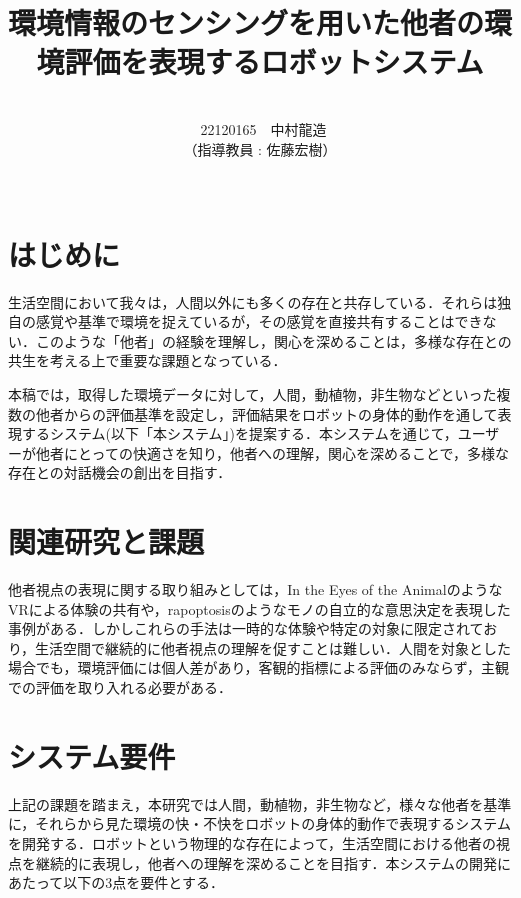 \documentclass[paper=a4paper,jafontsize=9pt,head_space=15mm,gutter=20mm,
twocolumn,number_of_lines=49, line_length=26zw]{myuarticle}
\begin{document}
\title{{\Large\bfseries\gtfamily 環境情報のセンシングを用いた他者の環境評価を表現するロボットシステム}}
\author{\\\ 22120165　中村龍造 \\ （指導教員 : 佐藤宏樹）\\ \\}
\date{}
\maketitle

\section{はじめに}
生活空間において我々は，人間以外にも多くの存在と共存している．それらは独自の感覚や基準で環境を捉えているが，その感覚を直接共有することはできない．このような「他者」の経験を理解し，関心を深めることは，多様な存在との共生を考える上で重要な課題となっている．

本稿では，取得した環境データに対して，人間，動植物，非生物などといった複数の他者からの評価基準を設定し，評価結果をロボットの身体的動作を通して表現するシステム(以下「本システム」)を提案する．本システムを通じて，ユーザーが他者にとっての快適さを知り，他者への理解，関心を深めることで，多様な存在との対話機会の創出を目指す．

\section{関連研究と課題}

他者視点の表現に関する取り組みとしては，In the Eyes of the Animal\cite{--EyesAnimal}のようなVRによる体験の共有や，rapoptosis\cite{--ソンヨン}のようなモノの自立的な意思決定を表現した事例がある．しかしこれらの手法は一時的な体験や特定の対象に限定されており，生活空間で継続的に他者視点の理解を促すことは難しい．人間を対象とした場合でも，環境評価には個人差があり，客観的指標による評価のみならず，主観での評価を取り入れる必要がある\cite{Coulby-2020-ScopingReviewTechnologicalApproaches}．

\section{システム要件}

上記の課題を踏まえ，本研究では人間，動植物，非生物など，様々な他者を基準に，それらから見た環境の快・不快をロボットの身体的動作で表現するシステムを開発する．ロボットという物理的な存在によって，生活空間における他者の視点を継続的に表現し，他者への理解を深めることを目指す．本システムの開発にあたって以下の3点を要件とする．
\end{document}
